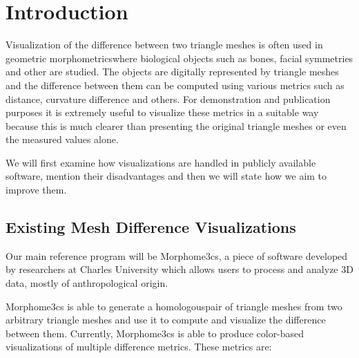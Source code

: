 \chapter*{Introduction}

Visualization of the difference between two triangle meshes is often used in geometric morphometrics\footnotemark where biological objects such as bones, facial symmetries and other are studied. The objects are digitally represented by triangle meshes and the difference between them can be computed using various metrics such as distance, curvature difference and others. For demonstration and publication purposes it is extremely useful to visualize these metrics in a suitable way because this is much clearer than presenting the original triangle meshes or even the measured values alone.


We will first examine how visualizations are handled in publicly available software, mention their disadvantages and then we will state how we aim to improve them.

\section*{Existing Mesh Difference Visualizations}

Our main reference program will be Morphome3cs\footnotemark, a piece of software developed by researchers at Charles University which allows users to process and analyze 3D data, mostly of anthropological origin.


Morphome3cs is able to generate a homologous\footnotemark pair of triangle meshes from two arbitrary triangle meshes and use it to compute and visualize the difference between them. Currently, Morphome3cs is able to produce color-based visualizations of multiple difference metrics. These metrics are:


